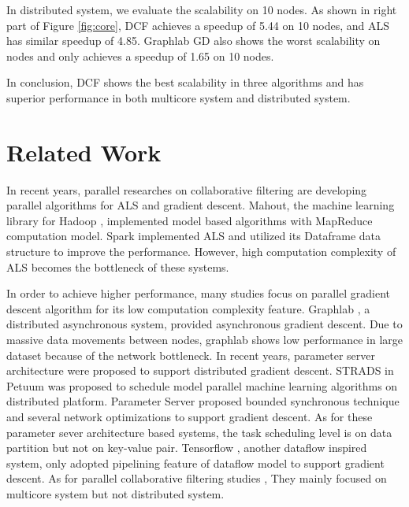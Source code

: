 \documentclass{llncs}
\begin{document}
In distributed system, we evaluate the scalability on 10 nodes. As shown in right part of Figure \ref{fig:core}, DCF achieves a speedup of 5.44 on 10 nodes, and ALS has similar speedup of 4.85. Graphlab GD also shows the worst scalability on nodes and only achieves a speedup of 1.65 on 10 nodes.

In conclusion, DCF shows the best scalability in three algorithms and has superior performance in both multicore system and distributed system.

\vspace{-10pt}
\section{Related Work}
\label{sec:relatedWork}
\vspace{-5pt}
In recent years, parallel researches on collaborative filtering are developing parallel algorithms for ALS and gradient descent. Mahout, the machine learning library for Hadoop \cite{Hadoop}, implemented model based algorithms with MapReduce \cite{MapReduce} computation model. Spark \cite{SparkMllib} implemented ALS \cite{SparkCF} and utilized its Dataframe \cite{dataFrame}  data structure to improve the performance. However, high computation complexity of ALS becomes the bottleneck of these systems.

In order to achieve higher performance, many studies focus on parallel gradient descent algorithm for its low computation complexity feature. Graphlab \cite{graphlab}, a distributed asynchronous system, provided asynchronous gradient descent. Due to massive data movements between nodes, graphlab shows low performance in large dataset because of the network bottleneck.
In recent years, parameter server architecture were proposed to support distributed gradient descent. STRADS \cite{strads} in Petuum was proposed to schedule model parallel machine learning algorithms on distributed platform. Parameter Server \cite{ps} proposed bounded synchronous technique and several network optimizations to support gradient descent. As for these parameter sever architecture based systems, the task scheduling level is on data partition but not on key-value pair. Tensorflow \cite{tensorflow}, another dataflow inspired system, only adopted pipelining feature of dataflow model to support gradient descent. As for parallel collaborative filtering studies \cite{sgdFast2015} \cite{sgdKdd2015} \cite{StarPU}, They mainly focused on multicore system but not distributed system.
\vspace{-15pt}
\end{document}
